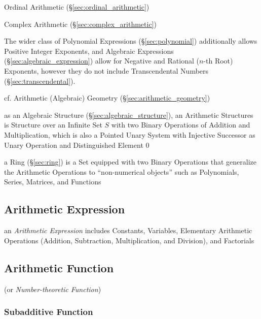 Ordinal Arithmetic (\S\ref{sec:ordinal_arithmetic})

Complex Arithmetic (\S\ref{sec:complex_arithmetic})

The wider class of Polynomial Expressions (\S\ref{sec:polynomial}) additionally
allows Positive Integer Exponents, and Algebraic Expressions
(\S\ref{sec:algebraic_expression}) allow for Negative and Rational ($n$-th
Root) Exponents, however they do not include Transcendental Numbers
(\S\ref{sec:transcendental}).

\fist cf. Arithmetic (Algebraic) Geometry
(\S\ref{sec:arithmetic_geometry})

as an Algebraic Structure (\S\ref{sec:algebraic_structure}), an Arithmetic
Structures is Structure over an Infinite Set $S$ with two Binary Operations of
Addition and Multiplication, which is also a Pointed Unary System with
Injective Successor as Unary Operation and Distinguished Element $0$

a Ring (\S\ref{sec:ring}) is a Set equipped with two Binary Operations that
generalize the Arithmetic Operations to ``non-numerical objects'' such as
Polynomials, Series, Matrices, and Functions



\subsection{Arithmetic Expression}\label{sec:arithmetic_expression}

an \emph{Arithmetic Expression} includes Constants, Variables, Elementary
Arithmetic Operations (Addition, Subtraction, Multiplication, and Division), and
Factorials



\subsection{Arithmetic Function}\label{sec:arithmetic_function}

(or \emph{Number-theoretic Function})



\subsubsection{Subadditive Function}\label{sec:subadditive_function}

